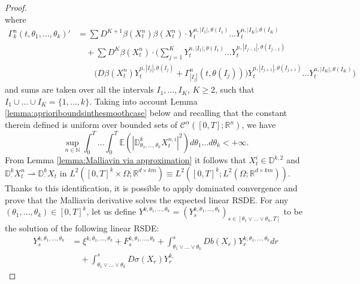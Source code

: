 \documentclass[11pt,a4paper]{article}
\newcommand{\R}{\mathbb{R}}
\theoremstyle{plain}
\begin{document}
\begin{proof}
{\begin{equation}
    \end{equation}
    where \begin{align*}
    \Gamma^n_k(t,\theta_1,\dots,\theta_k) ' &= \sum D^{K+1} \beta(X^n_t) \beta(X^n_t) \cdot Y^{n,|I_1|,\theta(I_1)}_t \dots Y^{n,|I_K|,\theta(I_K)}_t \\
        & \quad + \sum D^K \beta(X^n_t) \cdot \Big( \sum_{j=1}^K Y^{n,|I_1|,\theta(I_1)}_t \dots Y^{n,|I_{j-1}|,\theta(I_{j-1})}_t \\
        & \qquad  \Big( D\beta(X^n_t) Y_t^{n,|I_j|,\theta(I_j)} + \Gamma^n_{|I_j|}(t,\theta(I_j)) \Big) Y^{n,|I_{j+1}|,\theta(I_{j+1})}_t \dots Y^{n,|I_K|,\theta(I_K)}_t \Big)
    \end{align*}
    and sums are taken over all the intervals $I_1, \dots, I_K$, $K \ge 2$, such that $I_1 \cup \dots \cup I_K = \{1,\dots,k\}$. 
    }
  Taking into account Lemma \ref{lemma:aprioriboundsinthesmoothcase} below and recalling that the constant therein defined is uniform over
  bounded sets of $\mathscr{C}^{\alpha}([0,T];\R^n)$, we have \begin{equation*}
      \sup_{n \in \mathbb{N}} \int_0^T \ldots \int_0^T \mathbb{E} (|
     \mathbb{D}^k_{\theta_1, \ldots, \theta_k} X_t^{n,i} |^2) d \theta_1 \ldots d
     \theta_k < + \infty .
  \end{equation*}
  From Lemma \ref{lemma:Malliavin via approximation} it follows that $X_t^i \in
  \mathbb{D}^{k, 2}$ and $\mathbb{D}^k_{\cdot} X^n_t \rightharpoonup
  \mathbb{D}^k_{\cdot} X_t$ in $L^2 ([0, T]^k \times \Omega; \mathbb{R}^{d
  \times km}) \equiv L^2 ([0, T]^k ; L^2 (\Omega ;
  \mathbb{R}^{d \times km}))$. Thanks to this
  identification, it is possible to apply dominated convergence and prove
  that the Malliavin derivative solves the expected linear RSDE.
  For any $(\theta_1,\dots,\theta_k)\in[0,T]^k$, let us define $Y^{k,\theta_1,\dots,\theta_k}=(Y^{k,\theta_1,\dots,\theta_k}_s)_{s\in [\theta_1\vee\dots\vee\theta_k,T]}$ to be the solution of the following linear RSDE: \begin{align*}
     Y_s^{k, \theta_1, \ldots, \theta_k} & = 
    \xi^{k, \theta_1, \ldots, \theta_k} + F_s^{k, \theta_1, \ldots, \theta_k}
    + \int_{\theta_1 \vee \ldots \vee \theta_k}^s  Db(X_r) Y_r^{k,
    \theta_1, \ldots, \theta_k} d r  \\
    &\quad + \int_{\theta_1 \vee \ldots \vee \theta_k}^s D \sigma (X_r) Y_r^{k,
}
\end{align*}
\end{proof}
\end{document}
